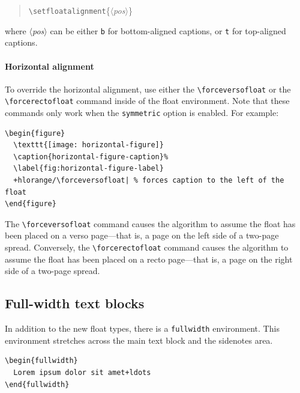 \documentclass[a4paper]{tufte-handout}
\newcommand{\hlorange}[1]{\textcolor{tufte-orange}{#1}}
\newcommand{\doccmd}[1]{\hlorange{\texttt{\textbackslash#1}}}
\newcommand{\docopt}[1]{\( \langle \)\textrm{\textit{#1}}\( \rangle \)}
\newcommand{\docenv}[1]{\hlorange{\texttt{#1}}}
\newcommand{\docclsopt}[1]{\hlorange{\texttt{#1}}}
\newenvironment{docspec}
  {\begin{quotation}\ttfamily\parskip0pt\parindent0pt\ignorespaces}
  {\end{quotation}}
\begin{document}
\begin{docspec}
  \doccmd{setfloatalignment}\{\docopt{pos}\}
\end{docspec}

\noindent where \docopt{pos} can be either \texttt{b} for bottom-aligned captions, or \texttt{t} for top-aligned captions.

\paragraph{Horizontal alignment}\label{par:horizontal-alignment}
To override the horizontal alignment, use either the \doccmd{forceversofloat} or the \doccmd{forcerectofloat} command inside of the float environment.
Note that these commands only work when the \docclsopt{symmetric} option is enabled.
For example:

\begin{Verbatim}[commandchars=+/|]
\begin{figure}
  \texttt{[image: horizontal-figure]}
  \caption{horizontal-figure-caption}%
  \label{fig:horizontal-figure-label}
  +hlorange/\forceversofloat| % forces caption to the left of the float
\end{figure}
\end{Verbatim}

\noindent The \doccmd{forceversofloat} command causes the algorithm to assume the float has been placed on a verso page---that is, a page on the left side of a two-page spread.
Conversely, the \doccmd{forcerectofloat} command causes the algorithm to assume the float has been placed on a recto page---that is, a page on the right side of a two-page spread.


\subsection{Full-width text blocks}\label{ssec:fullwidth}
In addition to the new float types, there is a \docenv{fullwidth} environment.
This environment stretches across the main text block and the sidenotes area.

\begin{Verbatim}[commandchars=+/|]
\begin{fullwidth}
  Lorem ipsum dolor sit amet+ldots
\end{fullwidth}
\end{Verbatim}

\begin{fullwidth}
\small\itshape\lipsum[1]
\end{fullwidth}
\end{document}
